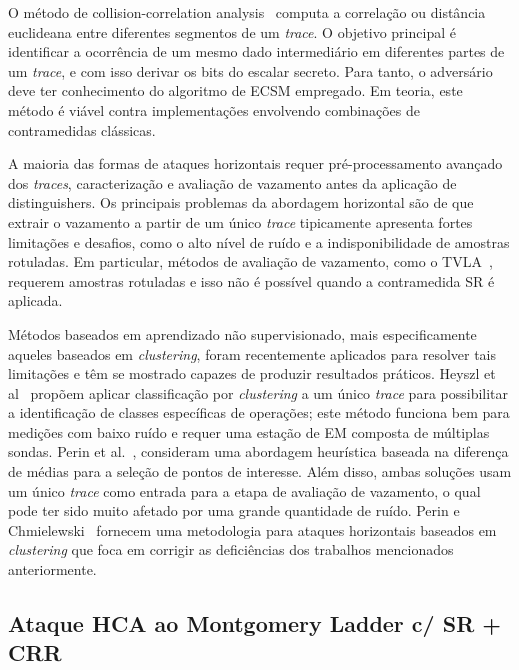 \documentclass{SBCbookchapter}
\begin{document}
O método de collision-correlation analysis~\cite{Bauer2013_CTRSA, Bauer2013, Clavier2012_Indocrypt, WittemanWoundenbergMenari2011, Walter2001_Ches} computa a correlação ou distância euclideana entre diferentes segmentos de um \emph{trace}. O objetivo principal é identificar a ocorrência de um mesmo dado intermediário em diferentes partes de um \emph{trace}, e com isso derivar os bits do escalar secreto. Para tanto, o adversário deve ter conhecimento do algoritmo de ECSM empregado. Em teoria, este método é viável contra implementações envolvendo combinações de contramedidas clássicas.

A maioria das formas de ataques horizontais requer pré-processamento avançado dos \emph{traces}, caracterização e avaliação de vazamento antes da aplicação de distinguishers. Os principais problemas da abordagem horizontal são de que extrair o vazamento a partir de um único \emph{trace} tipicamente apresenta fortes limitações e desafios, como o alto nível de ruído e a indisponibilidade de amostras rotuladas. Em particular, métodos de avaliação de vazamento, como o TVLA~\cite{Goodwill2011}, requerem amostras rotuladas e isso não é possível quando a contramedida SR é aplicada.

Métodos baseados em aprendizado não supervisionado, mais especificamente aqueles baseados em \emph{clustering}, foram recentemente aplicados para resolver tais limitações e têm se mostrado capazes de produzir resultados práticos. Heyszl et al~\cite{Heyszl2013} propõem aplicar classificação por \emph{clustering} a um único \emph{trace} para possibilitar a identificação de classes específicas de operações; este método funciona bem para medições com baixo ruído e requer uma estação de EM composta de múltiplas sondas. Perin et al.~\cite{Perin2014}, consideram uma abordagem heurística baseada na diferença de médias para a seleção de pontos de interesse. Além disso, ambas soluções usam um único \emph{trace} como entrada para a etapa de avaliação de vazamento, o qual pode ter sido muito afetado por uma grande quantidade de ruído. Perin e Chmielewski~\cite{PerinChmielewski2015} fornecem uma metodologia para ataques horizontais baseados em \emph{clustering} que foca em corrigir as deficiências dos trabalhos mencionados anteriormente.

\subsection{Ataque HCA ao Montgomery Ladder c/ SR + CRR}
\end{document}
